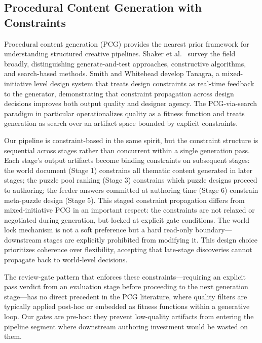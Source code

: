 \subsection{Procedural Content Generation with Constraints}

Procedural content generation (PCG) provides the nearest prior framework for understanding
structured creative pipelines. Shaker et al.\ \cite{shaker2016} survey the field broadly,
distinguishing generate-and-test approaches, constructive algorithms, and search-based
methods. Smith and Whitehead \cite{smith2010} develop Tanagra, a mixed-initiative level
design system that treats design constraints as real-time feedback to the generator,
demonstrating that constraint propagation across design decisions improves both output
quality and designer agency. The PCG-via-search paradigm in particular operationalizes
quality as a fitness function and treats generation as search over an artifact space
bounded by explicit constraints.

Our pipeline is constraint-based in the same spirit, but the constraint structure is
sequential across stages rather than concurrent within a single generation pass. Each
stage's output artifacts become binding constraints on subsequent stages: the world document
(Stage 1) constrains all thematic content generated in later stages; the puzzle pool ranking
(Stage 3) constrains which puzzle designs proceed to authoring; the feeder answers committed
at authoring time (Stage 6) constrain meta-puzzle design (Stage 5). This staged constraint
propagation differs from mixed-initiative PCG \cite{yannakakis2011} in an important
respect: the constraints are not relaxed or negotiated during generation, but locked at
explicit gate conditions. The world lock mechanism is not a soft preference but a hard
read-only boundary---downstream stages are explicitly prohibited from modifying it. This
design choice prioritizes coherence over flexibility, accepting that late-stage discoveries
cannot propagate back to world-level decisions.

The review-gate pattern that enforces these constraints---requiring an explicit pass verdict
from an evaluation stage before proceeding to the next generation stage---has no direct
precedent in the PCG literature, where quality filters are typically applied
post-hoc or embedded as fitness functions within a generative loop. Our gates are
pre-hoc: they prevent low-quality artifacts from entering the pipeline segment where
downstream authoring investment would be wasted on them.

